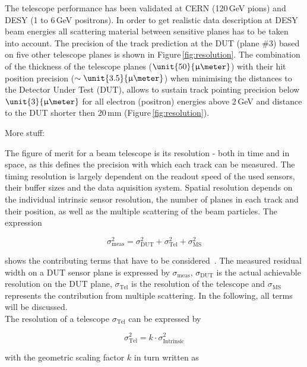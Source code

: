 
The telescope performance has been validated at CERN (120\,GeV pions) and DESY (1 to 6\,GeV positrons). 
In order to get realistic data description at DESY beam energies all scattering material between sensitive planes has to be taken into account. 
The precision of the track prediction at the DUT (plane \#3) based on five other telescope planes is shown in Figure\,\ref{fig:resolution}. 
The combination of the thickness of the telescope planes ($\unit{50}{\upmu\meter}$) with their hit position precision ($\sim\unit{3.5}{\upmu\meter}$)
 when minimising the distances to the Detector Under Test (DUT), 
 allows to sustain track pointing precision below $\unit{3}{\upmu\meter}$ for all electron (positron) energies above 2\,GeV and distance to the DUT shorter then 20\,mm (Figure\,\ref{fig:resolution}).

More stuff:


The figure of merit for a beam telescope is its resolution - both in time and in
space, as this defines the precision with which each track can be measured. The
timing resolution is largely dependent on the readout speed of the used
sensors, their buffer sizes and the data aquisition system. Spatial resolution
depends on the individual intrinsic sensor resolution, the number of planes in
each track and their position, as well as the multiple scattering of the beam
particles. The expression

\begin{equation}
\label{eq:telescoperesolutionequation}
\sigma_{\textrm{meas}}^2 = \sigma_{\textrm{DUT}}^2 + \sigma_{\textrm{Tel}}^2 +
\sigma_{\textrm{MS}}^2
\end{equation}

shows the contributing terms that have to be
considered~\cite{ref:eudetreport200902}. The measured residual width on a
DUT sensor plane is expressed by $\sigma_{\textrm{meas}}$,
$\sigma_{\textrm{DUT}}$ is the actual achievable resolution on the DUT plane,
$\sigma_{\textrm{Tel}}$ is the resolution of the telescope and
$\sigma_{\textrm{MS}}$ represents the contribution from multiple scattering.
In the following, all terms will be discussed.\\


The resolution of a telescope $\sigma_{\textrm{Tel}}$ can be expressed by

\begin{equation}
\sigma_{\textrm{Tel}}^2 = k \cdot \sigma_{\textrm{Intrinsic}}^2
\end{equation}

with the geometric scaling factor $k$ in turn written as

